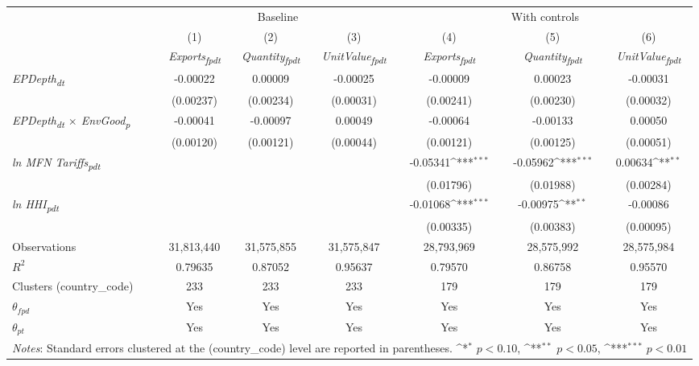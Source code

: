 {
\def\sym#1{\ifmmode^{#1}\else\(^{#1}\)\fi}
\begin{tabular}{l*{6}{c}}
\toprule
&\multicolumn{3}{c}{Baseline}&\multicolumn{3}{c}{With controls}\\\cmidrule(lr){2-4}\cmidrule(lr){5-7}
&(1)&(2)&(3)&(4)&(5)&(6)\\
&\textit{Exports\textsubscript{fpdt}}&\textit{Quantity\textsubscript{fpdt}}&\textit{UnitValue\textsubscript{fpdt}}&\textit{Exports\textsubscript{fpdt}}&\textit{Quantity\textsubscript{fpdt}}&\textit{UnitValue\textsubscript{fpdt}}\\
\midrule
\textit{EPDepth\textsubscript{dt}} & -0.00022 & 0.00009 & -0.00025 & -0.00009 & 0.00023 & -0.00031\\
 & (0.00237) & (0.00234) & (0.00031) & (0.00241) & (0.00230) & (0.00032)\\
\addlinespace
\textit{EPDepth\textsubscript{dt} $\times$ EnvGood\textsubscript{p}} & -0.00041 & -0.00097 & 0.00049 & -0.00064 & -0.00133 & 0.00050\\
 & (0.00120) & (0.00121) & (0.00044) & (0.00121) & (0.00125) & (0.00051)\\
\addlinespace
\textit{ln MFN Tariffs\textsubscript{pdt}} &  &  &  & -0.05341\sym{***} & -0.05962\sym{***} & 0.00634\sym{**}\\
 &  &  &  & (0.01796) & (0.01988) & (0.00284)\\
\addlinespace
\textit{ln HHI\textsubscript{pdt}} &  &  &  & -0.01068\sym{***} & -0.00975\sym{**} & -0.00086\\
 &  &  &  & (0.00335) & (0.00383) & (0.00095)\\
\midrule
Observations & 31,813,440 & 31,575,855 & 31,575,847 & 28,793,969 & 28,575,992 & 28,575,984\\
$R^{2}$ & 0.79635 & 0.87052 & 0.95637 & 0.79570 & 0.86758 & 0.95570\\
Clusters (country_code) & 233 & 233 & 233 & 179 & 179 & 179\\
$\theta_{fpd}$ & Yes & Yes & Yes & Yes & Yes & Yes\\
$\theta_{pt}$ & Yes & Yes & Yes & Yes & Yes & Yes\\
\bottomrule
\multicolumn{7}{l}{\footnotesize \textit{Notes}: Standard errors clustered at the (country_code) level are reported in parentheses. \sym{*} \(p<0.10\), \sym{**} \(p<0.05\), \sym{***} \(p<0.01\)}\\
\end{tabular}
}
